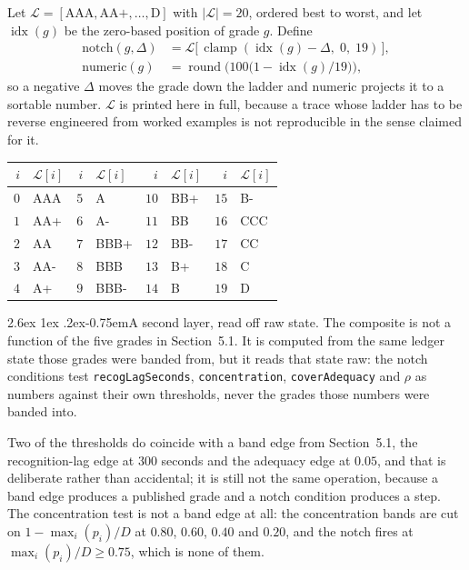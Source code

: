 \documentclass[11pt]{article}
\makeatletter
\renewcommand\paragraph{\@startsection{paragraph}{4}{\z@}%
  {2.6ex \@plus 1ex \@minus .2ex}{-0.75em}{\normalfont\normalsize\bfseries}}
\theoremstyle{orma}
\theoremstyle{ormaupright}
\DeclareMathOperator{\round}{round}
\DeclareMathOperator{\clamp}{clamp}
\DeclareMathOperator{\idx}{idx}
\makeatother
\begin{document}
Let $\mathcal{L} = [\text{AAA}, \text{AA+}, \ldots, \text{D}]$ with $|\mathcal{L}| = 20$,
ordered best to worst, and let $\idx(g)$ be the zero-based position of grade $g$. Define
\begin{align}
  \mathrm{notch}(g, \Delta) &= \mathcal{L}\big[\, \clamp(\idx(g) - \Delta,\; 0,\; 19) \,\big],
  \\[4pt]
  \mathrm{numeric}(g) &= \round\!\Big( 100 \big( 1 - \idx(g)/19 \big) \Big),
\end{align}
so a negative $\Delta$ moves the grade down the ladder and $\mathrm{numeric}$ projects it to
a sortable number. $\mathcal{L}$ is printed here in full, because a trace whose ladder has to
be reverse engineered from worked examples is not reproducible in the sense claimed for it.

\begin{center}
\small
\setlength{\tabcolsep}{7pt}
\begin{tabular}{rlrlrlrl}
\toprule
$i$ & $\mathcal{L}[i]$ & $i$ & $\mathcal{L}[i]$ & $i$ & $\mathcal{L}[i]$ & $i$ & $\mathcal{L}[i]$ \\
\midrule
$0$ & AAA & $5$ & A    & $10$ & BB+ & $15$ & B-  \\
$1$ & AA+ & $6$ & A-   & $11$ & BB  & $16$ & CCC \\
$2$ & AA  & $7$ & BBB+ & $12$ & BB- & $17$ & CC  \\
$3$ & AA- & $8$ & BBB  & $13$ & B+  & $18$ & C   \\
$4$ & A+  & $9$ & BBB- & $14$ & B   & $19$ & D   \\
\bottomrule
\end{tabular}
\end{center}

\paragraph{A second layer, read off raw state.} The composite is not a function of the five
grades in Section~5.1. It is computed from the same ledger state those grades were banded
from, but it reads that state raw: the notch conditions test \texttt{recogLagSeconds},
\texttt{concentration}, \texttt{coverAdequacy} and $\rho$ as numbers against their own
thresholds, never the grades those numbers were banded into.

Two of the thresholds do
coincide with a band edge from Section~5.1, the recognition-lag edge at $300$ seconds and the
adequacy edge at $0.05$, and that is deliberate rather than accidental; it is still not the
same operation, because a band edge produces a published grade and a notch condition produces
a step. The concentration test is not a band edge at all: the concentration bands are cut on
$1 - \max_i(p_i)/D$ at $0.80$, $0.60$, $0.40$ and $0.20$, and the notch fires at
$\max_i(p_i)/D \geq 0.75$, which is none of them.
\end{document}
